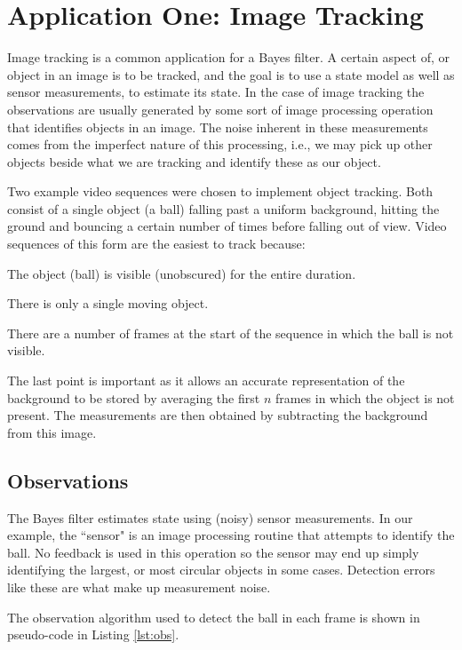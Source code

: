 \section{Application One: Image Tracking}\label{sec:image-tracking}
Image tracking is a common application for a Bayes filter. A certain aspect of, or
object in an image is to be tracked, and the goal is to use a state
model as well as sensor measurements, to estimate its state. In the case of image
tracking the observations are usually generated by some sort of image processing
operation that identifies objects in an image. The noise inherent in these measurements
comes from the imperfect nature of this processing, i.e., we may pick up other
objects beside what we are tracking and identify these as our object.

Two example video sequences were chosen to implement object tracking. Both consist
of a single object (a ball) falling past a uniform background, hitting the ground
and bouncing a certain number of times before falling out of view.
Video sequences of this form are the easiest to track because:
\begin{compactitem}
\item The object (ball) is visible (unobscured) for the entire duration.
\item There is only a single moving object.
\item There are a number of frames at the start of the sequence in which the
ball is not visible.
\end{compactitem}
The last point is important as it allows an accurate representation of the background
to be stored by averaging the first $n$ frames in which the object is not present.
The measurements are then obtained by subtracting the background from this image.

\subsection{Observations}
The Bayes filter estimates state using (noisy) sensor measurements. In our example,
the ``sensor" is an image processing routine that attempts to identify the ball.
No feedback is used in this operation so the sensor may end up simply identifying
the largest, or most circular objects in some cases. Detection errors like these
are what make up measurement noise.

The observation algorithm used to detect the ball in each frame is shown in
pseudo-code in Listing \ref{lst:obs}.

